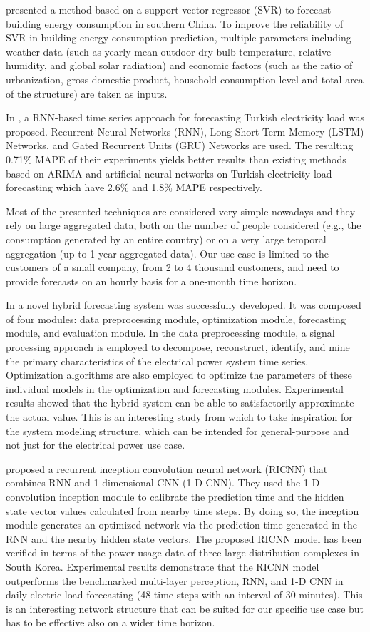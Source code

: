 \cite{MA20193433} presented a method based on a support vector regressor (SVR) to forecast building energy consumption in southern China.
To improve the reliability of SVR in building energy consumption prediction, multiple parameters including weather data (such as yearly mean outdoor dry-bulb temperature, relative humidity, and global solar radiation) and economic factors (such as the ratio of urbanization, gross domestic product, household consumption level and total area of the structure) are taken as inputs.

In \cite{8404313}, a RNN-based time series approach for forecasting Turkish electricity load was proposed.
Recurrent Neural Networks (RNN), Long Short Term Memory (LSTM) Networks, and Gated Recurrent Units (GRU) Networks are used.
The resulting 0.71\% MAPE of their experiments yields better results than existing methods based on ARIMA and artificial neural networks on Turkish electricity load forecasting which have 2.6\% and 1.8\% MAPE respectively.

Most of the presented techniques are considered very simple nowadays and they rely on large aggregated data, both on the number of people considered (e.g., the consumption generated by an entire country) or on a very large temporal aggregation (up to 1 year aggregated data).
Our use case is limited to the customers of a small company, from 2 to 4 thousand customers, and need to provide forecasts on an hourly basis for a one-month time horizon.

In \cite{DU2018533} a novel hybrid forecasting system was successfully developed.
It was composed of four modules: data preprocessing module, optimization module, forecasting module, and evaluation module.
In the data preprocessing module, a signal processing approach is employed to decompose, reconstruct, identify, and mine the primary characteristics of the electrical power system time series.
Optimization algorithms are also employed to optimize the parameters of these individual models in the optimization and forecasting modules.
Experimental results showed that the hybrid system can be able to satisfactorily approximate the actual value.
This is an interesting study from which to take inspiration for the system modeling structure, which can be intended for general-purpose and not just for the electrical power use case.

\cite{KIM2019328} proposed a recurrent inception convolution neural network (RICNN) that combines RNN and 1-dimensional CNN (1-D CNN).
They used the 1-D convolution inception module to calibrate the prediction time and the hidden state vector values calculated from nearby time steps.
By doing so, the inception module generates an optimized network via the prediction time generated in the RNN and the nearby hidden state vectors.
The proposed RICNN model has been verified in terms of the power usage data of three large distribution complexes in South Korea.
Experimental results demonstrate that the RICNN model outperforms the benchmarked multi-layer perception, RNN, and 1-D CNN in daily electric load forecasting (48-time steps with an interval of 30 minutes).
This is an interesting network structure that can be suited for our specific use case but has to be effective also on a wider time horizon.

